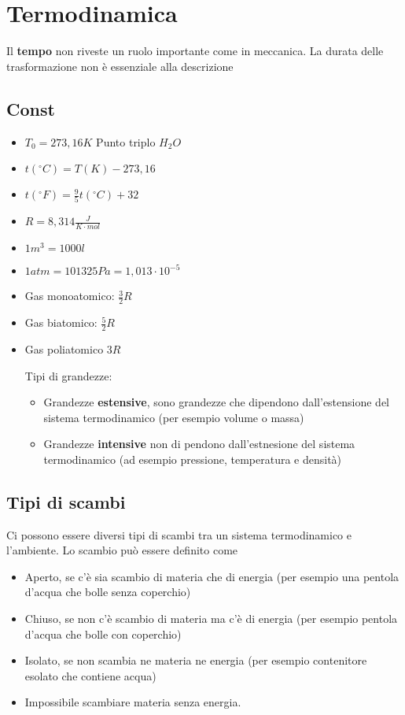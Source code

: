 \documentclass[a4paper]{report}
\begin{document}
  \chapter{Termodinamica}
  Il \textbf{tempo} non riveste un ruolo importante come in meccanica. La durata delle trasformazione non è essenziale alla descrizione

  \section{Const}
  \begin{itemize}
    \item $T_0 = 273,16 K$ Punto triplo $H_2O$
    \item $t(^\circ  C)= T(K) - 273,16$
    \item $t(^\circ  F)= \frac{9}{5} t(^\circ  C) + 32$
    \item $R = 8,314 \frac{J}{K \cdot mol}$
    \item $1 m^3 = 1000l$
    \item $1 atm = 101325Pa = 1,013 \cdot 10^{-5}$
    \item Gas monoatomico: $\frac{3}{2}R$
    \item Gas biatomico: $\frac{5}{2}R$
    \item Gas poliatomico $3 R$

    Tipi di grandezze:
    \begin{itemize}
      \item Grandezze \textbf{estensive}, sono grandezze che dipendono dall'estensione del sistema termodinamico (per esempio volume o massa)
      \item Grandezze \textbf{intensive} non di pendono dall'estnesione del sistema termodinamico (ad esempio pressione, temperatura e densità)
    \end{itemize}
  \end{itemize}

  \section{Tipi di scambi}
  Ci possono essere diversi tipi di scambi tra un sistema termodinamico e l'ambiente. Lo scambio può essere definito come
  \begin{itemize}
    \item Aperto, se c'è sia scambio di materia che di energia (per esempio una pentola d'acqua che bolle senza coperchio)
    \item Chiuso, se non c'è scambio di materia ma c'è di energia (per esempio pentola d'acqua che bolle con coperchio)
    \item Isolato, se non scambia ne materia ne energia (per esempio contenitore esolato che contiene acqua)
    \item Impossibile scambiare materia senza energia.
  \end{itemize}
\end{document}
